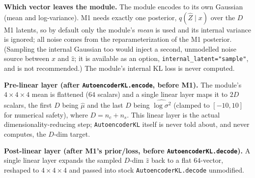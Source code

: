 \begin{enumerate}[label=(\arabic*),leftmargin=2em]
      \textbf{Which vector leaves the module.} The module encodes to its own Gaussian
      (mean and log-variance). M1 needs exactly one posterior, $q(\hat Z\mid x)$ over the $D$ M1
      latents, so by default only the module's \emph{mean} is used and its internal variance is
      ignored; all noise comes from the reparameterization of the M1 posterior. (Sampling the internal
      Gaussian too would inject a second, unmodelled noise source between $x$ and $\hat z$; it is
      available as an option, \texttt{internal\_latent="sample"}, and is not recommended.) The
      module's internal KL loss is never computed.

      \textbf{Pre-linear layer (after \texttt{AutoencoderKL.encode}, before M1).} The module's
      $4\times4\times4$ mean is flattened ($64$ scalars) and a single linear layer maps it to
      $2D$ scalars, the first $D$ being $\hat\mu$ and the last $D$ being $\hat{\log\sigma^2}$ (clamped to
      $[-10,10]$ for numerical safety), where $D=n_c+n_s$. This linear layer is the actual
      dimensionality-reducing step; \texttt{AutoencoderKL} itself is never told about, and never
      computes, the $D$-dim target.

      \textbf{Post-linear layer (after M1's prior/loss, before \texttt{AutoencoderKL.decode}).} A single
      linear layer expands the sampled $D$-dim $\hat z$ back to a flat $64$-vector, reshaped to
      $4\times4\times4$ and passed into stock \texttt{AutoencoderKL.decode} unmodified.


\end{enumerate}
